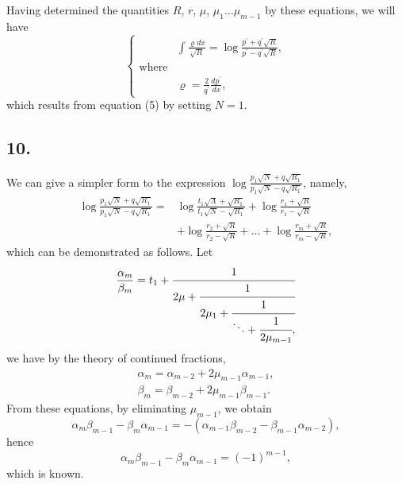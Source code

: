 \documentclass[oneside, 12 pt, leqno]{memoir}
\begin{document}
Having determined the quantities \(R\), \(r\), \(\mu\), \(\mu_1 \dots \mu_{m-1}\) by these equations, we will have
\[\tag{25}\left\{\begin{array}{lc}
&\int \frac{\varrho d x}{\sqrt{R}}=\log \frac{p^{\prime}+q^{\prime} \sqrt{R}}{p^{\prime}-q^{\prime} \sqrt{R}}, \\
\text{where} &\\
&\varrho=\frac{2}{q^{\prime}} \frac{d p^{\prime}}{d x},
\end{array}\right.\]
which results from equation (5) by setting \(N=1\).

\subsection*{10.}

We can give a simpler form to the expression \(\log \frac{p_1 \sqrt{N}+q \sqrt{R_1}}{p_1 \sqrt{N}-q \sqrt{R_1}}\), namely,
\[\begin{aligned}
\log \frac{p_1 \sqrt{N}+q \sqrt{R_1}}{p_1 \sqrt{N}-q \sqrt{R_1}}=&\log \frac{t_1 \sqrt{\Lambda}+\sqrt{R_1}}{t_1 \sqrt{N}-\sqrt{R_1}} +\log \frac{r_1+\sqrt{R}}{r_1-\sqrt{R}} \\
&+\log \frac{r_2+\sqrt{R}}{r_2-\sqrt{R}}+\dots+\log \frac{r_m+\sqrt{R}}{r_m-\sqrt{R}},
\end{aligned}\]
which can be demonstrated as follows. Let
\[\frac{\alpha_m}{\beta_m}=t_1+\cfrac{1}{2 \mu+\cfrac{1}{2 \mu_1+\cfrac{1}{\ddots+\cfrac{1}{2 \mu_{m-1}},}}}\]
we have by the theory of continued fractions,
\begin{align*}
\tag{a} \alpha_m=\alpha_{m-2}+2 \mu_{m-1} \alpha_{m-1}, \\
\tag{b} \beta_m=\beta_{m-2}+2 \mu_{m-1} \beta_{m-1}.
\end{align*}
From these equations, by eliminating \(\mu_{m-1}\), we obtain
\[\alpha_m \beta_{m-1}-\beta_m \alpha_{m-1}=-\left(\alpha_{m-1} \beta_{m-2}-\beta_{m-1} \alpha_{m-2}\right),\]
hence
\[\alpha_m \beta_{m-1}-\beta_m \alpha_{m-1}=(-1)^{m-1},\]
which is known.
\end{document}
